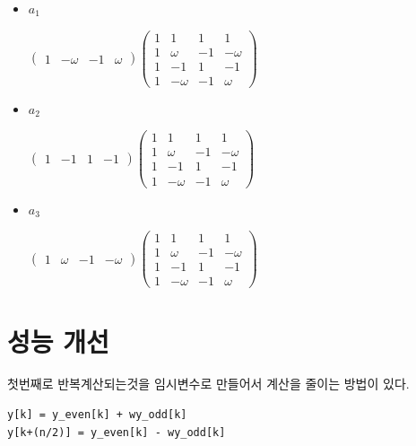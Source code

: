 \begin{itemize}
    \item $a_1$
    
    $
        \begin{pmatrix}
            1 & -\omega & -1 & \omega
        \end{pmatrix}
        \begin{pmatrix}
            1 & 1 & 1 & 1 \\
            1 & \omega & -1 & -\omega \\
            1 & -1 & 1 & -1 \\
            1 & -\omega & -1 & \omega 
        \end{pmatrix}
    $
    
    \item $a_2$
    
    $
    \begin{pmatrix}
        1 & -1 & 1 & -1
    \end{pmatrix}
    \begin{pmatrix}
        1 & 1 & 1 & 1 \\
        1 & \omega & -1 & -\omega \\
        1 & -1 & 1 & -1 \\
        1 & -\omega & -1 & \omega 
    \end{pmatrix}
    $
    \item $a_3$
    

    $
    \begin{pmatrix}
        1 & \omega & -1 & -\omega
    \end{pmatrix}
    \begin{pmatrix}
        1 & 1 & 1 & 1 \\
        1 & \omega & -1 & -\omega \\
        1 & -1 & 1 & -1 \\
        1 & -\omega & -1 & \omega 
    \end{pmatrix}
    $
\end{itemize}



\section{성능 개선}


첫번째로 반복계산되는것을 임시변수로 만들어서 계산을 줄이는 방법이 있다.

\begin{lstlisting}[style = CStyle]
y[k] = y_even[k] + wy_odd[k]
y[k+(n/2)] = y_even[k] - wy_odd[k]
\end{lstlisting}

